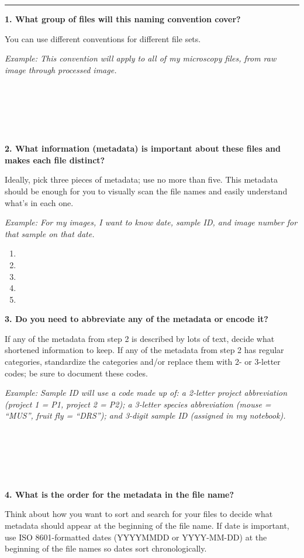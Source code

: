\documentclass[
]{book}
\providecommand{\tightlist}{%
  \setlength{\itemsep}{0pt}\setlength{\parskip}{0pt}}
\begin{document}
\begin{center}\rule{0.5\linewidth}{0.5pt}\end{center}

\textbf{1. What group of files will this naming convention cover?}

You can use different conventions for different file sets.

\emph{Example: This convention will apply to all of my microscopy files, from raw image through processed image.}

~

~

~

\textbf{2. What information (metadata) is important about these files and makes each file distinct?}

Ideally, pick three pieces of metadata; use no more than five. This metadata should be enough for you to visually scan the file names and easily understand what's in each one.

\emph{Example: For my images, I want to know date, sample ID, and image number for that sample on that date.}

\begin{enumerate}
\def\labelenumi{\arabic{enumi}.}
\tightlist
\item
\item
\item
\item
\item
\end{enumerate}

\textbf{3. Do you need to abbreviate any of the metadata or encode it?}

If any of the metadata from step 2 is described by lots of text, decide what shortened information to keep. If any of the metadata from step 2 has regular categories, standardize the categories and/or replace them with 2- or 3-letter codes; be sure to document these codes.

\emph{Example: Sample ID will use a code made up of: a 2-letter project abbreviation (project 1 = P1, project 2 = P2); a 3-letter species abbreviation (mouse = ``MUS'', fruit fly = ``DRS''); and 3-digit sample ID (assigned in my notebook).}

~

~

~

\textbf{4. What is the order for the metadata in the file name?}

Think about how you want to sort and search for your files to decide what metadata should appear at the beginning of the file name. If date is important, use ISO 8601-formatted dates (YYYYMMDD or YYYY-MM-DD) at the beginning of the file names so dates sort chronologically.
\end{document}
